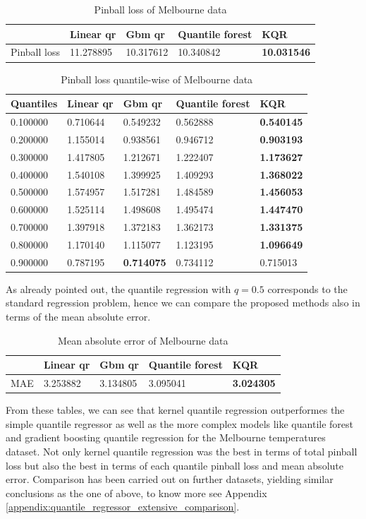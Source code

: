 \begin{table}[!h]
\caption{Pinball loss of Melbourne data}
\begin{tabular}{lllll}
    \toprule
     & Linear qr & Gbm qr & Quantile forest & KQR \\
    \midrule
    Pinball loss & 11.278895 & 10.317612 & 10.340842 & \textbf{10.031546} \\
    \bottomrule
    \end{tabular}
\end{table}

\begin{table}[!h]
    \caption{Pinball loss quantile-wise of Melbourne data}
    \begin{tabular}{lllll}
    \toprule
    Quantiles & Linear qr & Gbm qr & Quantile forest & KQR \\
    \midrule
    0.100000 & 0.710644 & 0.549232 & 0.562888 & \textbf{0.540145} \\
    0.200000 & 1.155014 & 0.938561 & 0.946712 & \textbf{0.903193} \\
    0.300000 & 1.417805 & 1.212671 & 1.222407 & \textbf{1.173627} \\
    0.400000 & 1.540108 & 1.399925 & 1.409293 & \textbf{1.368022} \\
    0.500000 & 1.574957 & 1.517281 & 1.484589 & \textbf{1.456053} \\
    0.600000 & 1.525114 & 1.498608 & 1.495474 & \textbf{1.447470} \\
    0.700000 & 1.397918 & 1.372183 & 1.362173 & \textbf{1.331375} \\
    0.800000 & 1.170140 & 1.115077 & 1.123195 & \textbf{1.096649} \\
    0.900000 & 0.787195 & \textbf{0.714075} & 0.734112 & 0.715013 \\
    \bottomrule
    \end{tabular}
\end{table}
As already pointed out, the quantile regression with $q=0.5$ corresponds to the standard regression problem, hence we can compare the proposed methods also in terms of the mean absolute error.
\begin{table}[!h]
\caption{Mean absolute error of Melbourne data}
\begin{tabular}{lllll}
    \toprule
     & Linear qr & Gbm qr & Quantile forest & KQR \\
    \midrule
    MAE & 3.253882 & 3.134805 & 3.095041 & \textbf{3.024305} \\
    \bottomrule
    \end{tabular}
\end{table}  
From these tables, we can see that kernel quantile regression outperformes the simple quantile regressor as well as the more complex models like quantile forest and gradient boosting quantile regression for the Melbourne temperatures dataset. Not only kernel quantile regression was the best in terms of total pinball loss but also the best in terms of each quantile pinball loss and mean absolute error.
Comparison has been carried out on further datasets, yielding similar conclusions as the one of above, to know more see Appendix \ref{appendix:quantile_regressor_extensive_comparison}.

